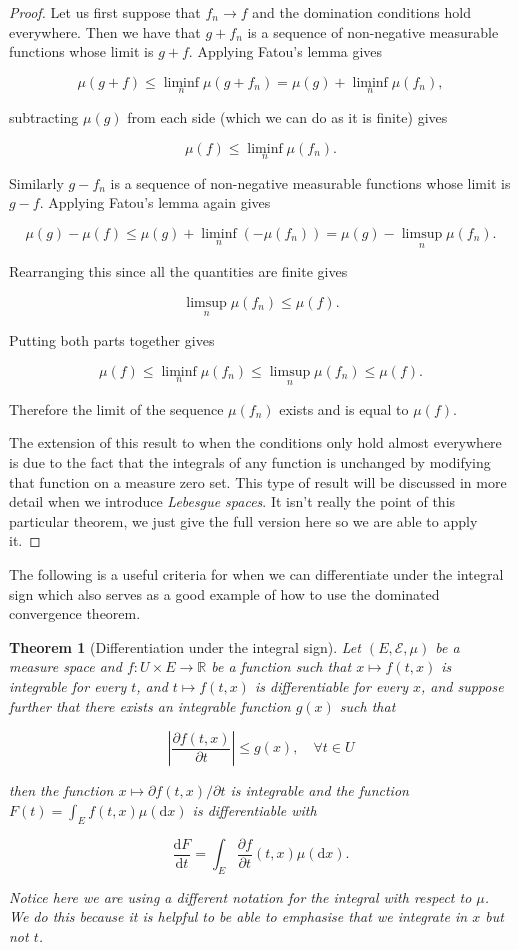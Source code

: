 \documentclass[
]{book}
\newtheorem{theorem}{Theorem}[chapter]
\theoremstyle{definition}
\theoremstyle{definition}
\theoremstyle{definition}
\theoremstyle{definition}
\theoremstyle{remark}
\begin{document}
\begin{proof}
Let us first suppose that \(f_n \rightarrow f\) and the domination conditions hold everywhere. Then we have that \(g+f_n\) is a sequence of non-negative measurable functions whose limit is \(g+f\). Applying Fatou's lemma gives

\[ \mu(g+f) \leq \liminf_n \mu(g+f_n) = \mu(g) + \liminf_n \mu(f_n), \]

subtracting \(\mu(g)\) from each side (which we can do as it is finite) gives

\[ \mu(f) \leq \liminf_n \mu(f_n). \]

Similarly \(g-f_n\) is a sequence of non-negative measurable functions whose limit is \(g-f\). Applying Fatou's lemma again gives

\[ \mu(g) - \mu(f) \leq \mu(g) + \liminf_n (-\mu(f_n)) = \mu(g) - \limsup_n \mu(f_n). \]

Rearranging this since all the quantities are finite gives

\[ \limsup_n \mu(f_n) \leq \mu(f). \]

Putting both parts together gives

\[ \mu(f) \leq \liminf_n \mu(f_n) \leq \limsup_n \mu(f_n) \leq \mu(f). \]

Therefore the limit of the sequence \(\mu(f_n)\) exists and is equal to \(\mu(f)\).

The extension of this result to when the conditions only hold almost everywhere is due to the fact that the integrals of any function is unchanged by modifying that function on a measure zero set. This type of result will be discussed in more detail when we introduce \emph{Lebesgue spaces}. It isn't really the point of this particular theorem, we just give the full version here so we are able to apply it.
\end{proof}

The following is a useful criteria for when we can differentiate under the integral sign which also serves as a good example of how to use the dominated convergence theorem.

\begin{theorem}[Differentiation under the integral sign]
Let \((E, \mathcal{E}, \mu)\) be a measure space and \(f: U \times E \rightarrow \mathbb{R}\) be a function such that \(x \mapsto f(t,x)\) is integrable for every \(t\), and \(t \mapsto f(t,x)\) is differentiable for every \(x\), and suppose further that there exists an integrable function \(g(x)\) such that

\[ \left| \frac{\partial f(t,x)}{\partial t} \right| \leq g(x), \quad \forall t \in U \]

then the function \(x \mapsto \partial f(t,x)/ \partial t\) is integrable and the function \(F(t) = \int_E f(t,x) \mu(\mathrm{d}x)\) is differentiable with

\[ \frac{\mathrm{d}F}{\mathrm{d}t} = \int_E \frac{\partial f}{\partial t}(t,x) \mu(\mathrm{d}x). \]

Notice here we are using a different notation for the integral with respect to \(\mu\). We do this because it is helpful to be able to emphasise that we integrate in \(x\) but not \(t\).
\end{theorem}
\end{document}
